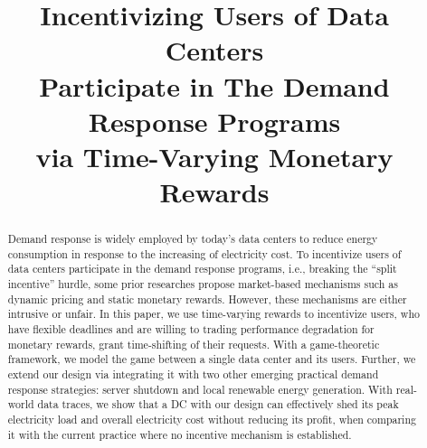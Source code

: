 \documentclass[conference]{IEEEtran}
\begin{document}
\title{Incentivizing Users of Data Centers \\Participate in The Demand Response Programs\\
via Time-Varying Monetary Rewards}


\author{

}




\maketitle

\begin{abstract}
Demand response is widely employed by today's data centers to reduce energy consumption in response to the increasing of electricity cost. To incentivize users of data centers participate in the demand response programs, i.e., breaking the ``split incentive'' hurdle, some prior researches propose market-based mechanisms such as dynamic pricing and static monetary rewards. However, these mechanisms are either intrusive or unfair. In this paper, we use time-varying rewards to incentivize users, who have flexible deadlines and are willing to trading performance degradation for monetary rewards, grant time-shifting of their requests. With a game-theoretic framework, we model the game  between a single data center and its users.  Further, we extend our design via integrating it with two other emerging practical demand response strategies: server shutdown and local renewable energy generation. With real-world data traces, we show that a DC with our design can effectively shed its peak electricity load and overall electricity cost without reducing its profit, when comparing it with the current practice where no incentive mechanism is established.
\end{abstract}







\IEEEpeerreviewmaketitle
\end{document}
